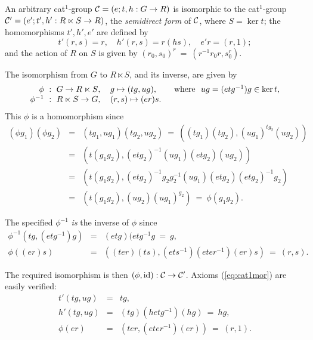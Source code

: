 \begin{prop} 
An arbitrary cat$^1$-group  $\mathcal{C} = (e;t,h : G \to R)$
is isomorphic to the cat$^1$-group
$\mathcal{C}' = (e';t',h' : R \ltimes S \to R)$, 
the \emph{semidirect form} of $\mathcal{C}$,   
where  $S = \ker t$;  
the homomorphisms $t',h',e'$  are defined by
\begin{equation} \label{eq:sdpcat1}
t'(r,s) = r, \quad h'(r,s) = r(hs), \quad e'r = (r,1); 
\end{equation}
and the action of $R$ on $S$ is given by $(r_0,s_0)^r ~=~ (r^{-1}r_0r, s_0^r)$. 
\end{prop} 
\begin{pf} 
The isomorphism from $G$ to $R \ltimes S$, and its inverse, are given by 
\begin{equation} \label{eq:cat1-sdp-fact} 
\begin{tabular}{r l}
$\phi ~:~ G \to R \ltimes S$, & $g \mapsto (tg,ug),
\qquad\mbox{where}~~  ug = (etg^{-1})g \in \ker t$, \\ 
$\phi^{-1} ~:~ R \ltimes S \to G$, & $(r,s) \mapsto (er)s$.
\end{tabular}
\end{equation}
This $\phi$ is a homomorphism since 
\begin{eqnarray*}
(\phi g_1)(\phi g_2) 
&=& (tg_1,ug_1)(tg_2,ug_2) 
~=~ \left( (tg_1)(tg_2), (ug_1)^{tg_2}(ug_2) \right) \\ 
&=& \left( t(g_1g_2), (etg_2)^{-1}(ug_1)(etg_2)(ug_2) \right) \\
&=& \left( t(g_1g_2), (etg_2)^{-1}g_2g_2^{-1}(ug_1)(etg_2)(etg_2)^{-1}g_2 \right) \\ 
&=& \left( t(g_1g_2), (ug_2)(ug_1)^{g_2} \right) 
~=~ \phi(g_1g_2).
\end{eqnarray*} 

\noindent 
The specified $\phi^{-1}$ \emph{is} the inverse of $\phi$ since 
\begin{eqnarray*}
\phi^{-1}(tg,(etg^{-1})g) 
&=& (etg)(etg^{-1}g ~=~ g, \\ 
\phi((er)s) 
&=& \left((ter)(ts), (ets^{-1})(eter^{-1})(er)s\right) 
~=~ (r,s). 
\end{eqnarray*}

\noindent 
The required isomorphism is then $(\phi,\mathrm{id}) : \mathcal{C} \to \mathcal{C}'$. 
Axioms (\ref{eq:cat1mor}) are easily verified: 
\begin{eqnarray*}
t'(tg,ug) &=& tg, \\ 
h'(tg,ug) &=& (tg)(hetg^{-1})(hg) ~=~ hg, \\ 
\phi(er)  &=& (ter,(eter^{-1})(er)) ~=~ (r,1). 
\end{eqnarray*}
\end{pf}

